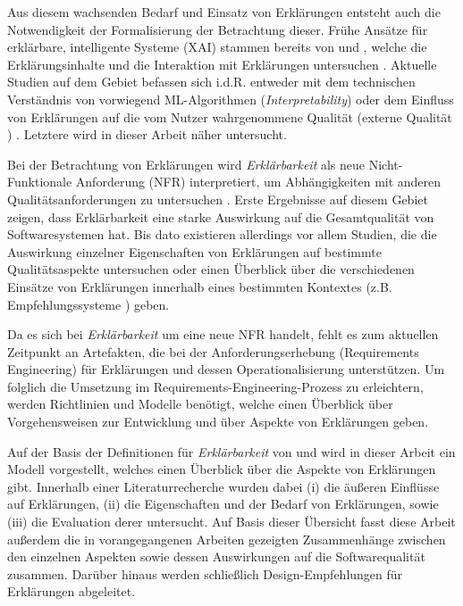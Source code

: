 Aus diesem wachsenden Bedarf und Einsatz von Erklärungen entsteht auch die Notwendigkeit der Formalisierung der Betrachtung dieser. Frühe Ansätze für erklärbare, intelligente Systeme (XAI) stammen bereits von \citeauthor{byrne1991construction} und \citeauthor{cawsey1991generating}, welche die Erklärungsinhalte \cite{byrne1991construction} und die Interaktion mit Erklärungen untersuchen \cite{cawsey1991generating}. Aktuelle Studien auf dem Gebiet befassen sich i.d.R. entweder mit dem technischen Verständnis von vorwiegend ML-Algorithmen (\textit{Interpretability}) \cite{gilpin_explaining_2018, fong_interpretable_2017, samek_towards_2019} oder dem Einfluss von Erklärungen auf die vom Nutzer wahrgenommene Qualität (externe Qualität \cite{international2011iso}) \cite{nunes_systematic_2017,kouki_user_2017,chazette_end-users_nodate}. Letztere wird in dieser Arbeit näher untersucht.

Bei der Betrachtung von Erklärungen wird \textit{Erklärbarkeit} als neue Nicht-Funktionale Anforderung (NFR) interpretiert, um Abhängigkeiten mit anderen Qualitätsanforderungen zu untersuchen \cite{kohl_explainability_2019, chazette2020explainability}. Erste Ergebnisse auf diesem Gebiet zeigen, dass Erklärbarkeit eine starke Auswirkung auf die Gesamtqualität von Softwaresystemen hat. Bis dato existieren allerdings vor allem Studien, die die Auswirkung einzelner Eigenschaften von Erklärungen auf bestimmte Qualitätsaspekte untersuchen oder einen Überblick über die verschiedenen Einsätze von Erklärungen innerhalb eines bestimmten Kontextes (z.B. Empfehlungssysteme \cite{nunes_systematic_2017}) geben.

Da es sich bei \textit{Erklärbarkeit} um eine neue NFR handelt, fehlt es zum aktuellen Zeitpunkt an Artefakten, die bei der Anforderungserhebung (Requirements Engineering) für Erklärungen und dessen Operationalisierung unterstützen. Um folglich die Umsetzung im Requirements-Engineering-Prozess zu erleichtern, werden Richtlinien und Modelle benötigt, welche einen Überblick über Vorgehensweisen zur Entwicklung und über Aspekte von Erklärungen geben. 

Auf der Basis der Definitionen für \textit{Erklärbarkeit} von \citeauthor[]{chazette_knowledge_nodate} und \citeauthor[]{kohl_explainability_2019} wird in dieser Arbeit ein Modell vorgestellt, welches einen Überblick über die Aspekte von Erklärungen gibt. Innerhalb einer Literaturrecherche wurden dabei (i) die äußeren Einflüsse auf Erklärungen, (ii) die Eigenschaften und der Bedarf von Erklärungen, sowie (iii) die Evaluation derer untersucht. Auf Basis dieser Übersicht fasst diese Arbeit außerdem die in vorangegangenen Arbeiten gezeigten Zusammenhänge zwischen den einzelnen Aspekten sowie dessen Auswirkungen auf die Softwarequalität zusammen. Darüber hinaus werden schließlich Design-Empfehlungen für Erklärungen abgeleitet.

